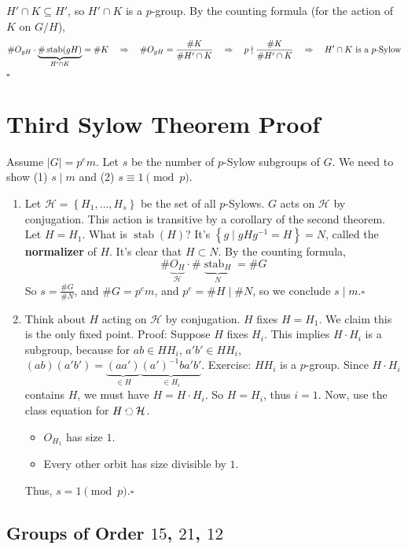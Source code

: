 \documentclass[10pt,letterpaper]{article}
\newcommand{\n}{\hfill\break}
\newcommand{\up}{\vspace{-\baselineskip}}
\newcommand{\proven}{\;$\square$\n}
\newcommand{\ptxt}[1]{\textrm{\textnormal{#1}}}
\newcommand{\card}[1]{\left|#1\right|}
\newcommand{\set}[1]{\left\{#1\right\}}
\newcommand{\inv}{^{-1}}
\newcommand{\ndiv}{\nmid}
\newcommand{\acts}{\;\reflectbox{\rotatebox[origin=c]{-90}{$\circlearrowright$}}\;}
\DeclareMathOperator{\stab}{stab}
\begin{document}
\par\noindent
$H'\cap{}K\subseteq{}H'$, so $H'\cap{}K$ is a $p$-group. By the counting formula (for the action of $K$ on $G/H$),\n
\[
	\#O_{gH}\cdot\underbrace{\#\stab(gH)}_{H'\cap{}K}=\#K\quad\Rightarrow\quad\#O_{gH}=\frac{\#K}{\#H'\cap{}K}\quad\Rightarrow\quad{}p\ndiv\frac{\#K}{\#H'\cap{}K}\quad\Rightarrow\quad{}H'\cap{}K\ptxt{ is a $p$-Sylow}
\]
\proven

\section*{Third Sylow Theorem Proof}

\par\noindent
Assume $\card{G}=p^{e}m$. Let $s$ be the number of $p$-Sylow subgroups of $G$. We need to show (1) $s\mid{}m$ and (2) $s\equiv{}1\pmod{p}$.\n

\begin{enumerate}[label=(\arabic*)]
	\item Let $\mathcal{H}=\set{H_{1},\ldots,H_{s}}$ be the set of all $p$-Sylows. $G$ acts on $\mathcal{H}$ by conjugation. This action is transitive by a corollary of the second theorem. Let $H=H_{1}$. What is $\stab(H)$? It's $\set{g\mid{}gHg\inv=H}=N$, called the \textbf{normalizer} of $H$. It's clear that $H\subset{}N$. By the counting formula,
	\[
		\#\underbrace{O_{H}}_{\mathcal{H}}\cdot\#\underbrace{\stab_{H}}_{N}=\#G
	\]
	So $s=\frac{\#G}{\#N}$, and $\#G=p^{e}m$, and $p^{e}=\#H\mid\#N$, so we conclude $s\mid{}m$.\up\proven
	\item Think about $H$ acting on $\mathcal{H}$ by conjugation. $H$ fixes $H=H_{1}$. We claim this is the only fixed point.\n
	Proof: Suppose $H$ fixes $H_{i}$. This implies $H\cdot{}H_{i}$ is a subgroup, because for $ab\in{}HH_{i}$, $a'b'\in{}HH_{i}$, $(ab)(a'b')=\underbrace{(aa')}_{\in{}H}\underbrace{(a')\inv{}ba'b'}_{\in{}H_{i}}$.\n
	Exercise: $HH_{i}$ is a $p$-group. Since $H\cdot{}H_{i}$ contains $H$, we must have $H=H\cdot{}H_{i}$.\n
	So $H=H_{i}$, thus $i=1$.\n
	Now, use the class equation for $H\acts\mathcal{H}$.
	\begin{itemize}
		\item $O_{H_{1}}$ has size $1$.
		\item Every other orbit has size divisible by $1$.
	\end{itemize}
	Thus, $s=1\pmod{p}$.\up\proven
\end{enumerate}

\subsection*{Groups of Order $15$, $21$, $12$}
\end{document}
